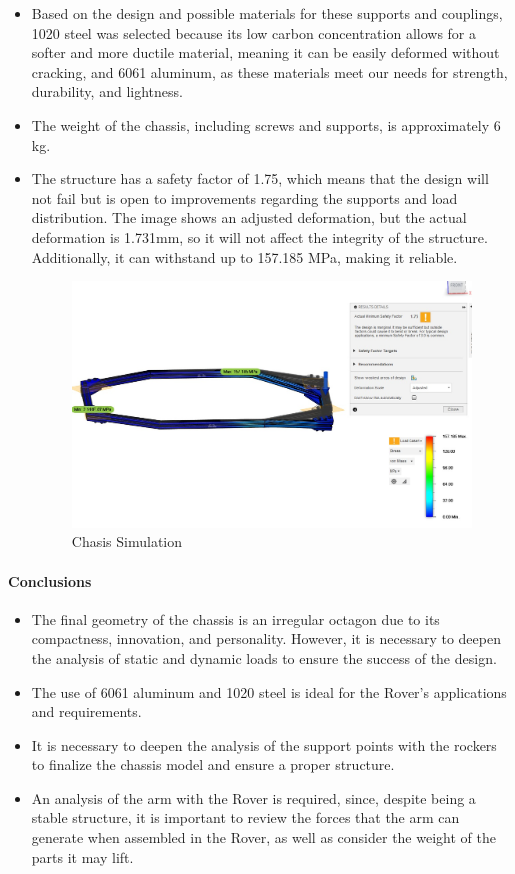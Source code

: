 \documentclass{article}
\begin{document}
\begin{itemize}
    \item Based on the design and possible materials for these supports and couplings, 1020 steel was selected because its low carbon concentration allows for a softer and more ductile material, meaning it can be easily deformed without cracking, and 6061 aluminum, as these materials meet our needs for strength, durability, and lightness.
    \item The weight of the chassis, including screws and supports, is approximately 6 kg.
    \item The structure has a safety factor of 1.75, which means that the design will not fail but is open to improvements regarding the supports and load distribution. The image shows an adjusted deformation, but the actual deformation is 1.731mm, so it will not affect the integrity of the structure. Additionally, it can withstand up to 157.185 MPa, making it reliable.
    \begin{figure}[H]
        \centering
        \includegraphics[width=\linewidth]{Images/Chasis/Sim1.jpg}
        \caption{Chasis Simulation}
    \end{figure}
\end{itemize}

\paragraph[short]{Conclusions}
\begin{itemize}
    \item The final geometry of the chassis is an irregular octagon due to its compactness, innovation, and personality. However, it is necessary to deepen the analysis of static and dynamic loads to ensure the success of the design.
    \item The use of 6061 aluminum and 1020 steel is ideal for the Rover’s applications and requirements.
    \item It is necessary to deepen the analysis of the support points with the rockers to finalize the chassis model and ensure a proper structure.
    \item An analysis of the arm with the Rover is required, since, despite being a stable structure, it is important to review the forces that the arm can generate when assembled in the Rover, as well as consider the weight of the parts it may lift.
    
\end{itemize}
\end{document}
